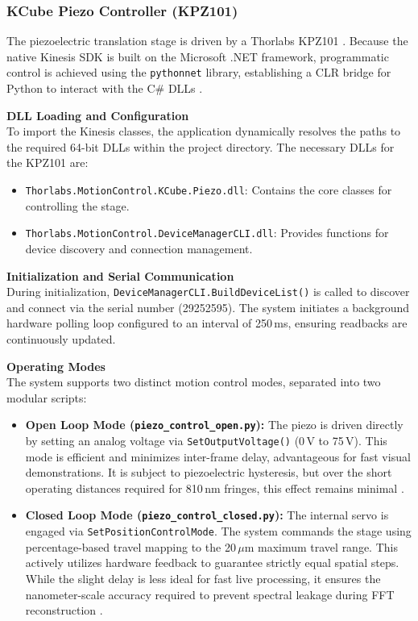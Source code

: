 \documentclass[12pt,a4paper]{article}
\begin{document}
        \subsubsection{KCube Piezo Controller (KPZ101)}
        The piezoelectric translation stage is driven by a Thorlabs \ac{KPZ101} \cite{ThorlabsKPZ101}. Because the native Kinesis \ac{SDK} is built on the Microsoft .NET framework, programmatic control is achieved using the \texttt{pythonnet} library, establishing a \ac{CLR} bridge for Python to interact with the C\# DLLs \cite{KinesisInPython}.

        \textbf{DLL Loading and Configuration} \\
        To import the Kinesis classes, the application dynamically resolves the paths to the required 64-bit DLLs within the project directory. The necessary DLLs for the \ac{KPZ101} are:
        
        \begin{itemize}
            \item \texttt{Thorlabs.MotionControl.KCube.Piezo.dll}: Contains the core classes for controlling the stage.
            \item \texttt{Thorlabs.MotionControl.DeviceManagerCLI.dll}: Provides functions for device discovery and connection management.
        \end{itemize}

        \textbf{Initialization and Serial Communication} \\
        During initialization, \texttt{DeviceManagerCLI.BuildDeviceList()} is called to discover and connect via the serial number (29252595). The system initiates a background hardware polling loop configured to an interval of 250\,ms, ensuring readbacks are continuously updated.

        \textbf{Operating Modes} \\
        The system supports two distinct motion control modes, separated into two modular scripts:
        \begin{itemize}
            \item \textbf{Open Loop Mode (\texttt{piezo\_control\_open.py}):} The piezo is driven directly by setting an analog voltage via \texttt{SetOutputVoltage()} (0\,V to 75\,V). This mode is efficient and minimizes inter-frame delay, advantageous for fast visual demonstrations. It is subject to piezoelectric hysteresis, but over the short operating distances required for 810\,nm fringes, this effect remains minimal \cite{ThorlabsKPZ101}.
            \item \textbf{Closed Loop Mode (\texttt{piezo\_control\_closed.py}):} The internal servo is engaged via \texttt{SetPositionControlMode}. The system commands the stage using percentage-based travel mapping to the 20\,$\mu$m maximum travel range. This actively utilizes hardware feedback to guarantee strictly equal spatial steps. While the slight delay is less ideal for fast live processing, it ensures the nanometer-scale accuracy required to prevent spectral leakage during \ac{FFT} reconstruction \cite{SpectralLeakageEssentials}.
        \end{itemize}
\end{document}
